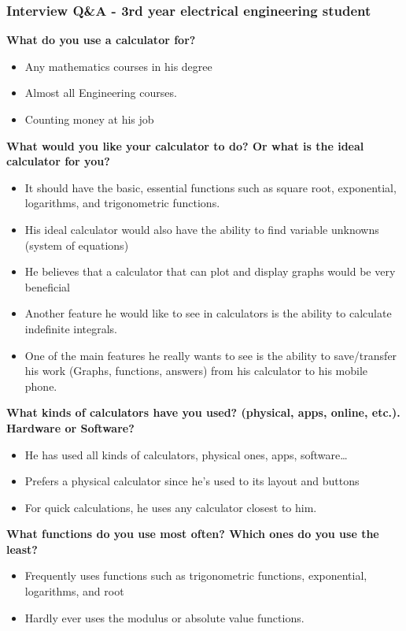 \documentclass[a4paper]{article}
\begin{document}
\subsubsection*{Interview Q\&A - 3rd year electrical engineering student}
\textbf{What do you use a calculator for?}
\begin{itemize}
\itemsep0em 
\item Any mathematics courses in his degree
\item Almost all Engineering courses.
\item Counting money at his job 
\end{itemize}

\textbf{What would you like your calculator to do? Or what is the ideal calculator for you?}
\begin{itemize}
\itemsep0em 
\item It should have the basic, essential functions such as square root, exponential, logarithms, and trigonometric functions.
\item His ideal calculator would also have the ability to find variable unknowns (system of equations) 
\item He believes that a calculator that can plot and display graphs would be very beneficial
\item Another feature he would like to see in calculators is the ability to calculate indefinite integrals.
\item One of the main features he really wants to see is the ability to save/transfer his work (Graphs, functions, answers) from his calculator to his mobile phone.
\end{itemize}

\textbf{What kinds of calculators have you used? (physical, apps, online, etc.). Hardware or Software?}
\begin{itemize}
\itemsep0em 
\item He has used all kinds of calculators, physical ones, apps, software…
\item Prefers a physical calculator since he’s used to its layout and buttons
\item For quick calculations, he uses any calculator closest to him.
\end{itemize}

\textbf{What functions do you use most often? Which ones do you use the least?}
\begin{itemize}
\itemsep0em 
\item Frequently uses functions such as trigonometric functions, exponential, logarithms, and root
\item Hardly ever uses the modulus or absolute value functions.
\end{itemize}
\end{document}
